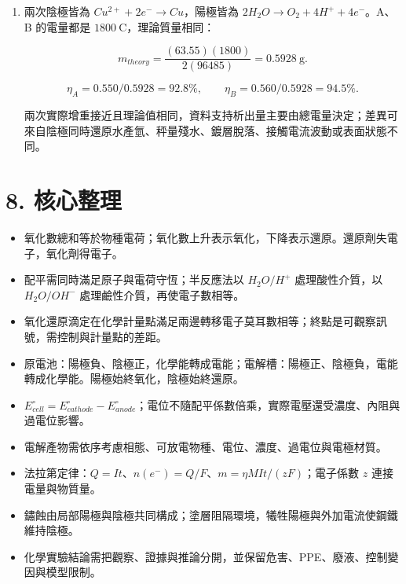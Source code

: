 \documentclass[11pt,a4paper]{article}
\providecommand{\tightlist}{%
  \setlength{\itemsep}{0pt}\setlength{\parskip}{0pt}}
\begin{document}
\begin{enumerate}
  真實設計需因電流隨鹽度、溫度與塗層破損改變、陽極可能鈍化、接觸電阻與電流分布不均，以及維修間隔留裕量。
\item
  兩次陰極皆為 \(Cu^{2+}+2e^-\rightarrow Cu\)，陽極皆為 \(2H_2O\rightarrow O_2+4H^++4e^-\)。A、B 的電量都是 \(1800\ \mathrm C\)，理論質量相同：

  \[
  m_{theory}=\frac{(63.55)(1800)}{2(96485)}=0.5928\ \mathrm g.
  \]

  \[
  \eta_A=0.550/0.5928=92.8\%,\qquad
  \eta_B=0.560/0.5928=94.5\%.
  \]

  兩次實際增重接近且理論值相同，資料支持析出量主要由總電量決定；差異可來自陰極同時還原水產氫、秤量殘水、鍍層脫落、接觸電流波動或表面狀態不同。
\end{enumerate}

\section{8. 核心整理}\label{ux6838ux5fc3ux6574ux7406}

\begin{itemize}
\tightlist
\item
  氧化數總和等於物種電荷；氧化數上升表示氧化，下降表示還原。還原劑失電子，氧化劑得電子。
\item
  配平需同時滿足原子與電荷守恆；半反應法以 \(H_2O/H^+\) 處理酸性介質，以 \(H_2O/OH^-\) 處理鹼性介質，再使電子數相等。
\item
  氧化還原滴定在化學計量點滿足兩邊轉移電子莫耳數相等；終點是可觀察訊號，需控制與計量點的差距。
\item
  原電池：陽極負、陰極正，化學能轉成電能；電解槽：陽極正、陰極負，電能轉成化學能。陽極始終氧化，陰極始終還原。
\item
  \(E^\circ_{cell}=E^\circ_{cathode}-E^\circ_{anode}\)；電位不隨配平係數倍乘，實際電壓還受濃度、內阻與過電位影響。
\item
  電解產物需依序考慮相態、可放電物種、電位、濃度、過電位與電極材質。
\item
  法拉第定律：\(Q=It\)、\(n(e^-)=Q/F\)、\(m=\eta MIt/(zF)\)；電子係數 \(z\) 連接電量與物質量。
\item
  鏽蝕由局部陽極與陰極共同構成；塗層阻隔環境，犧牲陽極與外加電流使鋼鐵維持陰極。
\item
  化學實驗結論需把觀察、證據與推論分開，並保留危害、PPE、廢液、控制變因與模型限制。
\end{itemize}
\end{document}
